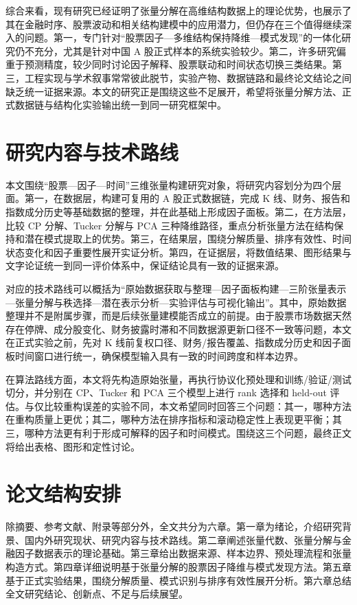 综合来看，现有研究已经证明了张量分解在高维结构数据上的理论优势，也展示了其在金融时序、股票波动和相关结构建模中的应用潜力，但仍存在三个值得继续深入的问题。第一，专门针对“股票因子—多维结构保持降维—模式发现”的一体化研究仍不充分，尤其是针对中国 A 股正式样本的系统实验较少。第二，许多研究偏重于预测精度，较少同时讨论因子解释、股票联动和时间状态切换三类结果。第三，工程实现与学术叙事常常彼此脱节，实验产物、数据链路和最终论文结论之间缺乏统一证据来源。本文的研究正是围绕这些不足展开，希望将张量分解方法、正式数据链与结构化实验输出统一到同一研究框架中。

\section{研究内容与技术路线}

本文围绕“股票—因子—时间”三维张量构建研究对象，将研究内容划分为四个层面。第一，在数据层，构建可复用的 A 股正式数据链，完成 K 线、财务、报告和指数成分历史等基础数据的整理，并在此基础上形成因子面板。第二，在方法层，比较 CP 分解、Tucker 分解与 PCA 三种降维路径，重点分析张量方法在结构保持和潜在模式提取上的优势。第三，在结果层，围绕分解质量、排序有效性、时间状态变化和因子重要性展开实证分析。第四，在证据层，将数值结果、图形结果与文字论证统一到同一评价体系中，保证结论具有一致的证据来源。

对应的技术路线可以概括为“原始数据获取与整理—因子面板构建—三阶张量表示—张量分解与秩选择—潜在表示分析—实验评估与可视化输出”。其中，原始数据整理并不是附属步骤，而是后续张量建模能否成立的前提。由于股票市场数据天然存在停牌、成分股变化、财务披露时滞和不同数据源更新口径不一致等问题，本文在正式实验之前，先对 K 线前复权口径、财务/报告覆盖、指数成分历史和因子面板时间窗口进行统一，确保模型输入具有一致的时间跨度和样本边界。

在算法路线方面，本文将先构造原始张量，再执行协议化预处理和训练/验证/测试切分，并分别在 CP、Tucker 和 PCA 三个模型上进行 rank 选择和 held-out 评估。与仅比较重构误差的实验不同，本文希望同时回答三个问题：其一，哪种方法在重构质量上更优；其二，哪种方法在排序指标和滚动稳定性上表现更平衡；其三，哪种方法更有利于形成可解释的因子和时间模式。围绕这三个问题，最终正文将给出表格、图形和定性讨论。

\section{论文结构安排}

除摘要、参考文献、附录等部分外，全文共分为六章。第一章为绪论，介绍研究背景、国内外研究现状、研究内容与技术路线。第二章阐述张量代数、张量分解与金融因子数据表示的理论基础。第三章给出数据来源、样本边界、预处理流程和张量构造方式。第四章详细说明基于张量分解的股票因子降维与模式发现方法。第五章基于正式实验结果，围绕分解质量、模式识别与排序有效性展开分析。第六章总结全文研究结论、创新点、不足与后续展望。


